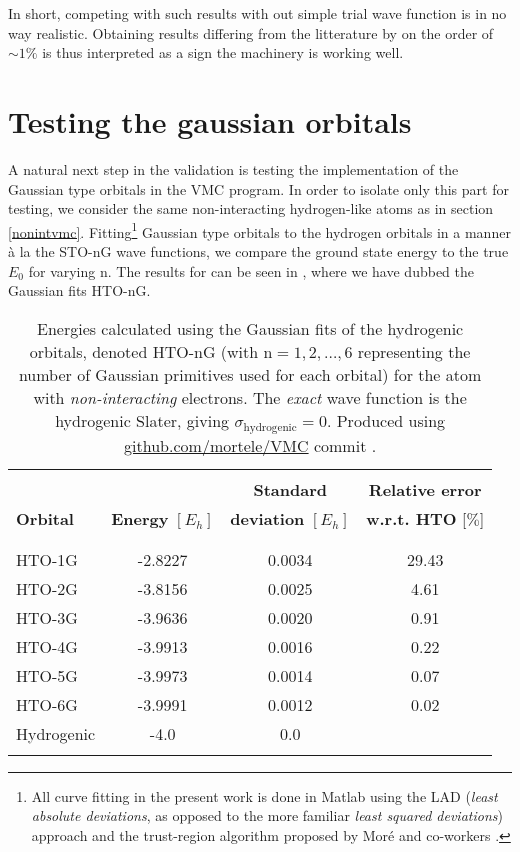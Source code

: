 \documentclass[../../master.tex]{subfiles}
\begin{document}
In short, competing with such results with out simple trial wave function is in no way realistic. Obtaining results differing from the litterature by on the order of $\sim 1\%$ is thus interpreted as a sign the machinery is working well. 


\section{Testing the gaussian orbitals}
A natural next step in the validation is testing the implementation of the Gaussian type orbitals in the VMC program. In order to isolate only this part for testing, we consider the same non-interacting hydrogen-like atoms as in section \ref{nonintvmc}. Fitting\footnote{All curve fitting in the present work is done in {\sc Matlab} using the LAD (\emph{least absolute deviations}, as opposed to the more familiar \emph{least squared deviations}) approach and the trust-region algorithm proposed by Moré and co-workers \cite{charnes1955optimal,koenker1978regression,more1983computing}.} Gaussian type orbitals to the hydrogen orbitals in a manner à la the STO-nG wave functions, we compare the ground state energy to the true $E_0$ for varying n. The results for  can be seen in , where we have dubbed the Gaussian fits HTO-nG.

\begin{table}
\centering{}
\setlength\extrarowheight{2pt}
\begin{tabularx}{\textwidth}{X *{3}{S[table-format=-1.3,table-space-text-post=***]}}
\hline
\hline
\\[-0.9em]
                 &                          & \phantom{-}\textbf{Standard}          & \textbf{Relative error}    \\
\textbf{Orbital} & \textbf{Energy} $[E_h]$  & \textbf{deviation} $[E_h]$ & \textbf{w.r.t. HTO} [$\%$]  \\
\\[-0.9em]
\hline
\\[-0.9em]
HTO-1G & -2.8227  & 0.0034  &   29.43 \\
HTO-2G & -3.8156  & 0.0025  &    4.61 \\
HTO-3G & -3.9636  & 0.0020  &    0.91 \\
HTO-4G & -3.9913  & 0.0016  &    0.22 \\
HTO-5G & -3.9973  & 0.0014  &    0.07 \\
HTO-6G & -3.9991  & 0.0012  &    0.02 \\
Hydrogenic    & -4.0    & 0.0 & \\
\\[-0.9em]
\hline
\end{tabularx}
\caption{Energies calculated using the Gaussian fits of the hydrogenic orbitals, denoted HTO-nG (with n$=1,2,\dots,6$ representing the number of Gaussian primitives used for each orbital) for the  atom with \emph{non-interacting} electrons. The \emph{exact} wave function is the hydrogenic Slater, giving $\sigma_\text{hydrogenic}=0$. Produced using \url{github.com/mortele/VMC} commit . \label{tab:vmcgaussnonint}}
\end{table}
\end{document}
